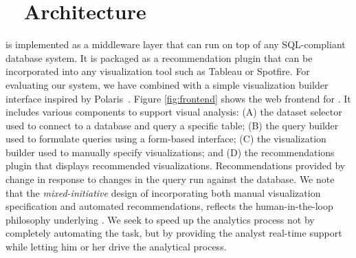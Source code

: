 

\section{{\large \SeeDB\ } Architecture}
\label{sec:system_architecture}

\SeeDB is implemented as a middleware layer that can run on
top of any SQL-compliant database system. 
It is packaged as a recommendation plugin that can
be incorporated into any visualization tool such as Tableau or Spotfire. 
For evaluating our system, we have combined \SeeDB with a simple visualization
builder interface inspired by Polaris~\cite{polaris}.
Figure \ref{fig:frontend} shows the web frontend for \SeeDB.
It includes various components to support visual analysis: 
(A) the dataset selector used to
connect to a database and query a specific table; (B) the query builder used to
formulate queries using a form-based interface; (C) the visualization builder
used to manually specify visualizations; and (D) the \SeeDB recommendations plugin
that displays recommended visualizations.
Recommendations provided by \SeeDB change in response to changes in the query
run against the database.
We note that the {\em mixed-initiative} design of \SeeDB incorporating both manual
visualization specification and automated recommendations, reflects the
human-in-the-loop philosophy underlying \SeeDB.
We seek to speed up the analytics process not by completely automating the task, but
by providing the analyst real-time support while letting him or her drive the 
analytical process.


